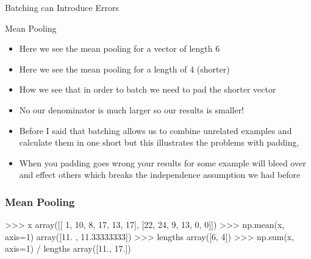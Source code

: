 \documentclass{beamer}
\begin{document}
\begin{section}{Batching can Introduce Errors}
\begin{subsection}{Mean Pooling}
\begin{frame}
{\begin{itemize}
                        features across a sentence to get the representation for the whole sentence.
                    \item Here we see the mean pooling for a vector of length 6
                    \item<2-> Here we see the mean pooling for a length of 4 (shorter)
                    \item<3-> How we see that in order to batch we need to pad the shorter vector
                    \item<3-> No our denominator is much larger so our results is smaller!
                    \item<3-> Before I said that batching allows us to combine unrelated examples and calculate them in
                        one short but this illustrates the problems with padding,
                    \item<3-> When you padding goes wrong your results for some example will bleed over and effect
                        others which breaks the independence assumption we had before
                \end{itemize}
            }
        \end{frame}

\begin{frame}[fragile]
    \frametitle{Mean Pooling}

    \begin{pythoncode}
            >>> x
            array([[ 1, 10,  8, 17, 13, 17],
                   [22, 24,  9, 13,  0,  0]])
            >>> np.mean(x, axis=1)
            array([11.        , 11.33333333])
            >>> lengths
            array([6, 4])
            >>> np.sum(x, axis=1) / lengths
            array([11., 17.])
    \end{pythoncode}



\end{frame}
\end{subsection}
\end{section}
\end{document}

